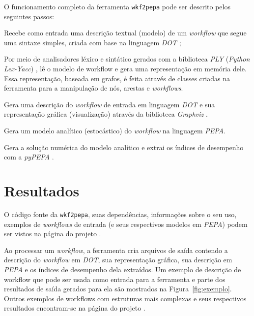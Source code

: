 \documentclass[a4paper,10pt]{article}
\begin{document}
        O funcionamento completo da ferramenta \texttt{wkf2pepa} pode ser descrito pelos seguintes passos:
        \begin{enumerate*}
            \item Recebe como entrada uma descrição textual (modelo) de um \emph{workflow} que segue uma sintaxe simples, criada com base na linguagem \emph{DOT} \cite{web:dot};
            \item Por meio de analisadores léxico e sintático gerados com a biblioteca \emph{PLY} (\emph{Python Lex-Yacc}) \cite{web:ply}, lê o modelo de workflow e gera uma representação em memória dele. Essa representação, baseada em grafos, é feita através de classes criadas na ferramenta para a manipulação de nós, arestas e \emph{workflows}.
            \item Gera uma descrição do \emph{workflow} de entrada em linguagem \emph{DOT} e sua representação gráfica (visualização) através da biblioteca \emph{Graphviz} \cite{web:graphviz}.
            \item Gera um modelo analítico (estocástico) do \emph{workflow} na linguagem \emph{PEPA}.
            \item Gera a solução numérica do modelo analítico e extrai os índices de desempenho com a  \emph{pyPEPA} .
        \end{enumerate*}


    \section*{Resultados}

    O código fonte da \texttt{wkf2pepa}, suas dependências, informações sobre o seu uso, exemplos de \emph{workflows} de entrada (e seus respectivos modelos em \emph{PEPA}) podem ser vistos na página do projeto \cite{web:script}.

    Ao processar um \emph{workflow}, a ferramenta cria arquivos de saída contendo a descrição do \emph{workflow} em \emph{DOT}, sua representação gráfica, sua descrição em \emph{PEPA} e os índices de desempenho dela extraídos. Um exemplo de descrição de workflow que pode ser usada como entrada para a ferramenta e parte dos resultados de saída gerados para ela são mostrados  na Figura~\ref{fig:exemplo}. Outros exemplos de workflows com estruturas mais complexas e seus respectivos resultados encontram-se na página do projeto \cite{web:script}.
\end{document}
